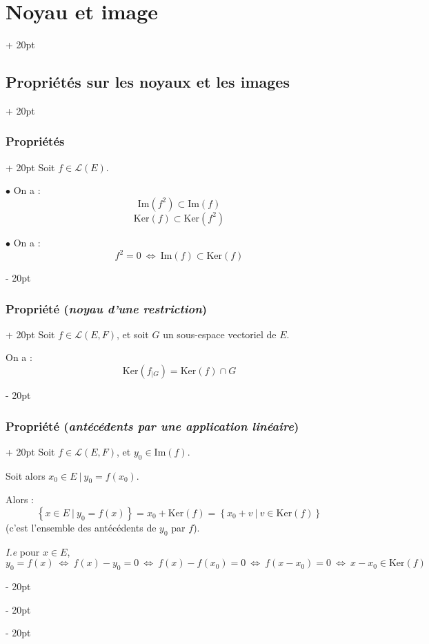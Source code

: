 \documentclass[a4paper, 12pt, twoside]{article}
\newcommand{\lr}[1]{\left( #1 \right)}
\newcommand{\set}[1]{\left\{ #1 \right\}}
\newcommand{\ssi}{\ \Leftrightarrow \ }
\newcommand{\ind}[1][20pt]{\advance\leftskip + #1}
\newcommand{\deind}[1][20pt]{\advance\leftskip - #1}
\newenvironment{indt}[2][20pt]{#2 \par \ind[#1]}{\par \deind} %
\begin{document}
\begin{indt}{\section{Noyau et image}}
\begin{indt}{\subsection{Propriétés sur les noyaux et les images}}
            \vspace{12pt}
            
            \begin{indt}{\subsubsection{Propriétés}}
                Soit $f \in \mathcal L(E)$.

                $\bullet$ On a :
                \[
                    \mathrm{Im}\!\lr{f^2} \subset \mathrm{Im}(f)
                \]
                \[
                    \mathrm{Ker}(f) \subset \mathrm{Ker}\!\lr{f^2}
                \]

                \vspace{6pt}
                
                $\bullet$ On a :
                \[
                    f^2 = 0 \ssi \mathrm{Im}(f) \subset \mathrm{Ker}(f)
                \]
            \end{indt}

            \vspace{12pt}
            
            \begin{indt}{\subsubsection{Propriété (\textit{noyau d'une restriction})}}
                Soit $f \in \mathcal L(E, F)$, et soit $G$ un sous-espace vectoriel de $E$.

                On a :
                \[
                    \mathrm{Ker}(f_{| G}) = \mathrm{Ker}(f) \cap G
                \]
            \end{indt}

            \vspace{12pt}
            
            \begin{indt}{\subsubsection{Propriété (\textit{antécédents par une application linéaire})}}
                Soit $f \in \mathcal L(E, F)$, et $y_0 \in \mathrm{Im}(f)$.

                Soit alors $x_0 \in E\ |\ y_0 = f(x_0)$.

                Alors :
                \[
                    \set{x \in E\ |\ y_0 = f(x)}
                    = x_0 + \mathrm{Ker}(f)
                    = \set{x_0 + v\ |\ v \in \mathrm{Ker}(f)}
                \]
                (c'est l'ensemble des antécédents de $y_0$ par $f$).

                \textit{I.e} pour $x \in E$, $y_0 = f(x) \ssi f(x) - y_0 = 0 \ssi f(x) - f(x_0) = 0 \ssi f(x - x_0) = 0 \ssi x - x_0 \in \mathrm{Ker}(f)$
            \end{indt}
        \end{indt}
    \end{indt}
\end{document}
